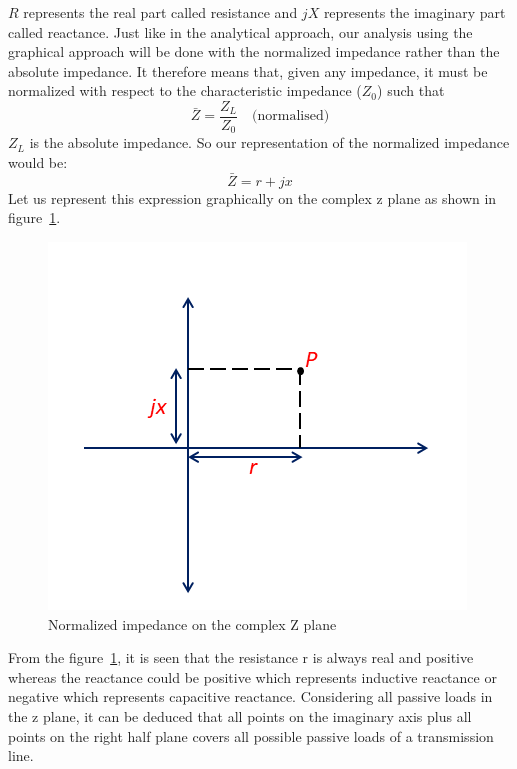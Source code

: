 $R$ represents the real part called resistance and $jX$ represents the imaginary part called reactance. Just like in the analytical approach, our analysis using the graphical approach will be done with the normalized impedance rather than the absolute impedance. It therefore means that, given any impedance, it must be normalized with respect to the characteristic impedance ($Z_0$) such that
\begin{equation*}
\bar{Z}=\frac{Z_L}{Z_0} \quad \text{(normalised)}
\end{equation*}
$Z_L$ is the absolute impedance. So our representation of the normalized impedance would be:
\begin{equation*}
\bar{Z}= r + jx
\end{equation*}
Let us represent this expression graphically on the complex z plane as shown in figure~\ref{fig:transline2}.
\begin{figure}[h]
\center\includegraphics[width=0.8\linewidth]{./graphics/Zplane}
\caption{Normalized impedance on the complex Z plane}
\label{fig:transline2}
\end{figure}

From the figure~\ref{fig:transline2}, it is seen that the resistance r is always real and positive whereas the reactance could be positive which represents inductive reactance or negative which represents capacitive reactance. Considering all passive loads in the z plane, it can be deduced that all points on the imaginary axis plus all points on the right half plane covers all possible passive loads of a transmission line.

